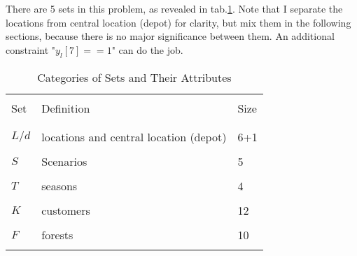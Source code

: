 \documentclass[fleqn,10pt]{wlscirep}
\begin{document}
There are 5 sets in this problem, as revealed in tab.\ref{tab:2}. Note that I separate the locations from central location (depot) for clarity, but mix them in the following sections, because there is no major significance between them. An additional constraint "$y_l[7] == 1$" can do the job.
\begin{table}[ht]
    \centering
    \begin{tabular}{l l l}
        \hline
        \\[-1em]
        Set & Definition & Size \\
        \\[-1em]
        \hline
        \\[-1em]
        $L/d$ & locations and central location (depot) & 6+1\\
        \\[-1em]
        $S$ & Scenarios & 5 \\
        \\[-1em]
        $T$ & seasons & 4 \\
        \\[-1em]
        $K$ & customers & 12 \\
        \\[-1em]
        $F$ & forests & 10 \\
        \\[-1em]
        \hline
    \end{tabular}
    \caption{Categories of Sets and Their Attributes}
    \label{tab:2}
\end{table}
\FloatBarrier
\end{document}
